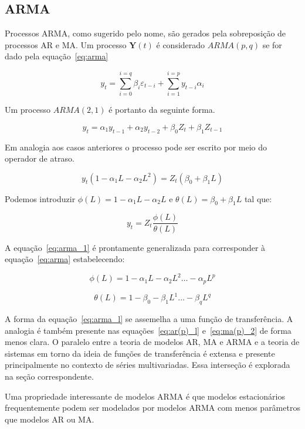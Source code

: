 \subsection{ARMA}\label{ssec:ARMA}

Processos ARMA, como sugerido pelo nome, são gerados pela sobreposição de
processos AR e MA. Um processo $\mathbf{Y}(t)$ é considerado $ARMA(p, q)$ se
for dado pela equação~\ref{eq:arma}

\begin{equation}\label{eq:arma}
    y_t = \sum_{i=0}^{i=q} \beta_i \varepsilon_{t-i} + \sum_{i=1}^{i=p} y_{t-i}\alpha_i
\end{equation}

Um processo $ARMA(2, 1)$ é portanto da seguinte forma.

$$ y_t = \alpha_1 y_{t-1} + \alpha_2 y_{t-2} + \beta_0 Z_{t} + \beta_1 Z_{t-1}  $$

Em analogia aos casos anteriores o processo pode ser escrito por meio do
operador de atraso.

$$ y_t (1 - \alpha_1 L - \alpha_2 L^2) = Z_{t} (\beta_0 + \beta_1 L) $$

Podemos introduzir $\phi(L) = 1 - \alpha_1 L - \alpha_2 L$ e $\theta(L) =
\beta_0 + \beta_1 L$ tal que:

\begin{equation}\label{eq:arma_l}
    y_t = Z_t \frac{\phi(L)}{\theta(L)}
\end{equation}

A equação~\ref{eq:arma_1} é prontamente generalizada para corresponder à
equação~\ref{eq:arma} estabelecendo:

$$\phi(L) = 1 - \alpha_1 L - \alpha_2 L^2 \hdots - \alpha_p L^p$$

$$\theta(L) = 1 - \beta_0 - \beta_1 L^1 \hdots - \beta_q L^q$$

A forma da equação~\ref{eq:arma_l} se assemelha a uma função de transferência.
A analogia é também presente nas equações~\ref{eq:ar(p)_l} e~\ref{eq:ma(p)_2}
de forma menos clara. O paralelo entre a teoria de modelos AR, MA e ARMA e a
teoria de sistemas em torno da ideia de funções de transferência é extensa
e presente principalmente no contexto de séries multivariadas. Essa
interseção é explorada na seção correspondente.


Uma propriedade interessante de modelos ARMA é que modelos estacionários
frequentemente podem ser modelados por modelos ARMA com menos parâmetros que
modelos AR ou MA.

